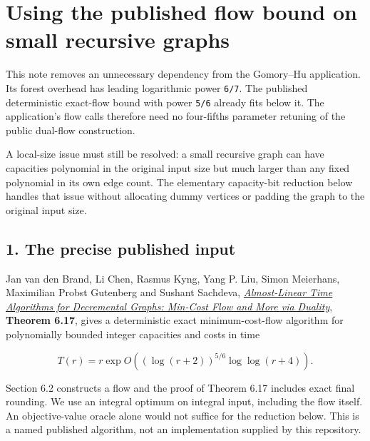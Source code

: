 
\hypertarget{af-bcf24248b3-using-the-published-flow-bound-on-small-recursive-graphs}{%
\section{Using the published flow bound on small recursive graphs}\label{af-bcf24248b3-using-the-published-flow-bound-on-small-recursive-graphs}}

This note removes an unnecessary dependency from the Gomory--Hu application. Its forest overhead has leading logarithmic power \texttt{6/7}. The published deterministic exact-flow bound with power \texttt{5/6} already fits below it. The application's flow calls therefore need no four-fifths parameter retuning of the public dual-flow construction.

A local-size issue must still be resolved: a small recursive graph can have capacities polynomial in the original input size but much larger than any fixed polynomial in its own edge count. The elementary capacity-bit reduction below handles that issue without allocating dummy vertices or padding the graph to the original input size.

\hypertarget{af-bcf24248b3-the-precise-published-input}{%
\subsection{1. The precise published input}\label{af-bcf24248b3-the-precise-published-input}}

Jan van den Brand, Li Chen, Rasmus Kyng, Yang P. Liu, Simon Meierhans, Maximilian Probst Gutenberg and Sushant Sachdeva, \href{https://arxiv.org/html/2407.10830v1}{\emph{Almost-Linear Time Algorithms for Decremental Graphs: Min-Cost Flow and More via Duality}}, \textbf{Theorem 6.17}, gives a deterministic exact minimum-cost-flow algorithm for polynomially bounded integer capacities and costs in time

\[
T(r)=r\exp O\!\left((\log(r+2))^{5/6}\log\log(r+4)\right).
\]

Section 6.2 constructs a flow and the proof of Theorem 6.17 includes exact final rounding. We use an integral optimum on integral input, including the flow itself. An objective-value oracle alone would not suffice for the reduction below. This is a named published algorithm, not an implementation supplied by this repository.

